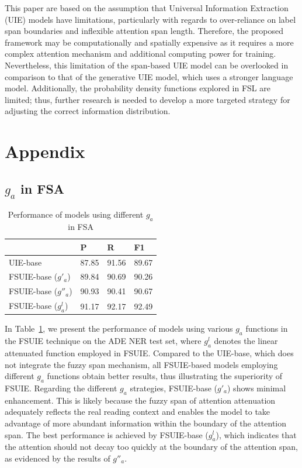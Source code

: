 \documentclass[11pt]{article}
\begin{document}
This paper are based on the assumption that Universal Information Extraction (UIE) models have limitations, particularly with regards to over-reliance on label span boundaries and inflexible attention span length. Therefore, the proposed framework may be computationally and spatially expensive as it requires a more complex attention mechanism and additional computing power for training. Nevertheless, this limitation of the span-based UIE model can be overlooked in comparison to that of the generative UIE model, which uses a stronger language model. Additionally, the probability density functions explored in FSL are limited; thus, further research is needed to develop a more targeted strategy for adjusting the correct information distribution.




\clearpage
\section{Appendix}

\subsection{$g_{a}$ in FSA}

\begin{table}[!ht]
    \centering
    \small
    \begin{tabular}{llll}
        \toprule
        \textbf{} & \textbf{P} & \textbf{R} & \textbf{F1 } \\ 
        \midrule
        UIE-base & 87.85 & 91.56 & 89.67  \\ 
        FSUIE-base ($g'_{a}$) &89.84  &90.69  &90.26   \\ 
        FSUIE-base ($g''_{a}$) &90.93  &90.41  &90.67   \\ 
        FSUIE-base ($g^{l}_{a}$) & 91.17 & 92.17 & 92.49  \\ 
        \bottomrule
    \end{tabular}
    \caption{Performance of models using different $g_{a}$ in FSA}
    \label{tab:different_g_results}
\end{table}

In Table~\ref{tab:different_g_results}, we present the performance of models using various $g_{a}$ functions in the FSUIE technique on the ADE NER test set, where $g^{l}_{a}$ denotes the linear attenuated function employed in FSUIE. Compared to the UIE-base, which does not integrate the fuzzy span mechanism, all FSUIE-based models employing different $g_{a}$ functions obtain better results, thus illustrating the superiority of FSUIE. Regarding the different $g_{a}$ strategies, FSUIE-base ($g'_{a}$) shows minimal enhancement. This is likely because the fuzzy span of attention attenuation adequately reflects the real reading context and enables the model to take advantage of more abundant information within the boundary of the attention span. The best performance is achieved by FSUIE-base ($g^{l}_{a}$), which indicates that the attention should not decay too quickly at the boundary of the attention span, as evidenced by the results of $g''_{a}$.
\end{document}
